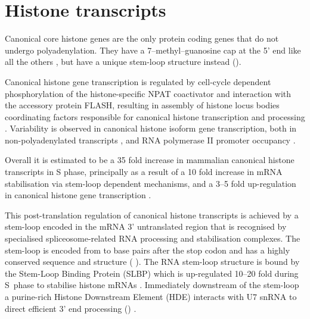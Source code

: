 \section{Histone transcripts}


  Canonical core histone genes are the only protein coding genes that do
  not undergo polyadenylation.  They have a 7--methyl--guanosine cap
  at the 5' end like all the others \citep{MarzluffNatRevGen2008},
  but have a unique stem-loop structure instead ().

  Canonical histone gene transcription is regulated
  by cell-cycle dependent phosphorylation of the histone-specific NPAT coactivator
  and interaction with the accessory protein FLASH,
  resulting in assembly of histone locus bodies
  coordinating factors responsible for canonical histone transcription and processing
  \citep{MarzluffNatRevGen2008,RattrayMueller2012,Hoefig2014}.
  Variability is observed in canonical histone isoform gene transcription,
  both in non-polyadenylated transcripts \citep{YangGenomeBiol2011},
  and RNA polymerase II promoter occupancy \citep{Ederveen2011}.

  Overall it is estimated to be a 35 fold increase in mammalian canonical histone transcripts in S phase,
  principally as a result of a 10 fold increase in mRNA stabilisation via stem-loop dependent mechanisms,
  and a 3--5 fold up-regulation in canonical histone gene transcription \citep{HarrisMCB1991}.

  This post-translation regulation of canonical histone transcripts
  is achieved by a stem-loop encoded in the mRNA 3' untranslated region
  that is recognised by specialised spliceosome-related RNA processing and stabilisation complexes.
  The stem-loop is encoded from \StemLoopStart{} to \StemLoopEnd{} base pairs after the stop codon
  and has a highly conserved sequence and structure ( \citep{stem-loop-structure}).
  The RNA stem-loop structure is bound by the Stem-Loop Binding Protein (SLBP)
  which is up-regulated 10--20 fold during S~phase to stabilise histone mRNAs \citep{SLBP-regulation}.
  Immediately downstream of the stem-loop a purine-rich Histone Downstream Element (HDE)
  interacts with U7 snRNA to direct efficient 3' end processing () \citep{HDE-sequence}.

